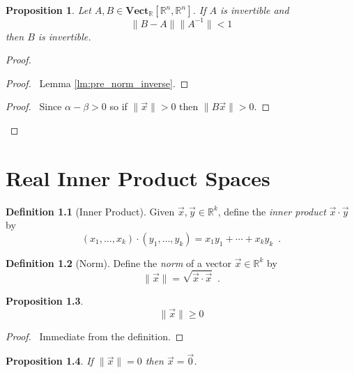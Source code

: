 \documentclass{book}
\let\qed\relax
\newtheorem{prop}{Proposition}[chapter]
\theoremstyle{definition}
\newtheorem{df}[prop]{Definition}
\begin{document}
\begin{prop}
\label{prop:norm_inverse}
Let $A,B \in \mathbf{Vect}_\mathbb{R}[\mathbb{R}^n, \mathbb{R}^n]$. If $A$ is invertible and
\[ \| B - A \| \| A^{-1} \| < 1 \]
then $B$ is invertible.
\end{prop}

\begin{proof}
\pf
{}
\begin{proof}
	\pf\ Lemma \ref{lm:pre_norm_inverse}.
\end{proof}
\begin{proof}
	\pf\ Since $\alpha - \beta > 0$ so if $\| \vec{x} \| > 0$ then $\| B \vec{x} \| > 0$.
\end{proof}
\qed
\end{proof}

\chapter{Real Inner Product Spaces}

\begin{df}[Inner Product]
Given $\vec{x}, \vec{y} \in \mathbb{R}^k$, define the \emph{inner product} $\vec{x} \cdot \vec{y}$ by
\[ (x_1, \ldots, x_k) \cdot (y_1, \ldots, y_k) = x_1 y_1 + \cdots + x_k y_k \enspace . \]
\end{df}

\begin{df}[Norm]
Define the \emph{norm} of a vector $\vec{x} \in \mathbb{R}^k$ by
\[ \|\vec{x}\| = \sqrt{\vec{x} \cdot \vec{x}} \enspace . \]
\end{df}

\begin{prop}
\[ \|\vec{x}\| \geq 0 \]
\end{prop}

\begin{proof}
\pf\ Immediate from the definition. \qed
\end{proof}

\begin{prop}
If $\|\vec{x}\| = 0$ then $\vec{x} = \vec{0}$.
\end{prop}
\end{document}
